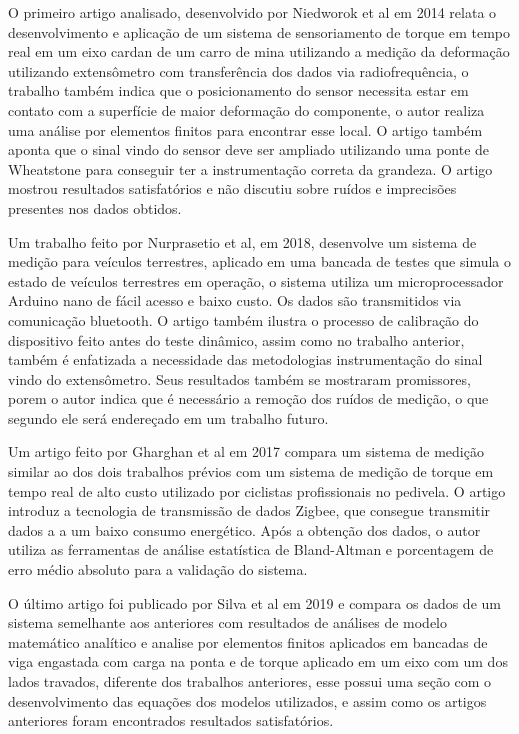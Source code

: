 O primeiro artigo analisado, desenvolvido por Niedworok et al em 2014 relata o desenvolvimento e aplicação de um sistema de sensoriamento de torque em tempo real em um eixo cardan de um carro de mina utilizando a medição da deformação utilizando extensômetro com transferência dos dados via radiofrequência, o trabalho também indica que o posicionamento do sensor necessita estar em contato com a superfície de maior deformação do componente, o autor realiza uma análise por elementos finitos para encontrar esse local. O artigo também aponta que o sinal vindo do sensor deve ser ampliado utilizando uma ponte de Wheatstone para conseguir ter a instrumentação correta da grandeza. O artigo mostrou resultados satisfatórios e não discutiu sobre ruídos e imprecisões presentes nos dados obtidos.

Um trabalho feito por Nurprasetio et al, em 2018, desenvolve um sistema de medição para veículos terrestres, aplicado em uma bancada de testes que simula o estado de veículos terrestres em operação, o sistema utiliza um microprocessador Arduino nano de fácil acesso e baixo custo.
Os dados são transmitidos via comunicação bluetooth.
O artigo também ilustra o processo de calibração do dispositivo feito antes do teste dinâmico, assim como no trabalho anterior, também é enfatizada a necessidade das metodologias instrumentação do sinal vindo do extensômetro.
Seus resultados também se mostraram promissores, porem o autor indica que é necessário a remoção dos ruídos de medição, o que segundo ele será endereçado em um trabalho futuro.

Um artigo feito por Gharghan et al em 2017 compara um sistema de medição similar ao dos dois trabalhos prévios com um sistema de medição de torque em tempo real de alto custo utilizado por ciclistas profissionais no pedivela.
O artigo introduz a tecnologia de transmissão de dados Zigbee, que consegue transmitir dados a a um baixo consumo energético.
Após a obtenção dos dados, o autor utiliza as ferramentas de análise estatística de Bland-Altman e porcentagem de erro médio absoluto para a validação do sistema.

O último artigo foi publicado por Silva et al em 2019 e compara os dados de um sistema semelhante aos anteriores com resultados de análises de modelo matemático analítico e analise por elementos finitos aplicados em bancadas de viga engastada com carga na ponta e de torque aplicado em um eixo com um dos lados travados, diferente dos trabalhos anteriores, esse possui uma seção com o desenvolvimento das equações dos modelos utilizados, e assim como os artigos anteriores foram encontrados resultados satisfatórios.

